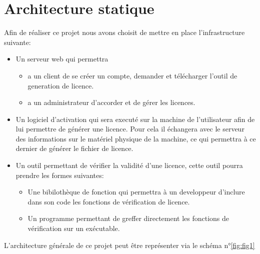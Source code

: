 \chapter{Architecture statique}
Afin de réaliser ce projet nous avons choisit de mettre en place l'infrastructure suivante:
\begin{itemize}
	\item Un serveur web qui permettra
	\begin{itemize}
		\item a un client de se créer un compte, demander et télécharger l'outil de generation
					de licence.
		\item a un administrateur d'accorder et de gérer les licences. 
	\end{itemize}
	\item Un logiciel d'activation qui sera executé sur la machine de l'utilisateur
				afin de lui permettre de générer une licence. Pour cela il échangera avec
				le serveur des informations sur le matériel physique de la machine, ce 
				qui permettra à ce dernier de générer le fichier de licence.
	\item Un outil permettant de vérifier la validité d'une licence, cette outil
				pourra prendre les formes suivantes: 
	\begin{itemize}
	\item Une bibilothèque de fonction qui permettra à un developpeur d'inclure
				dans son code les fonctions de vérification de licence. 
	\item Un programme permettant de greffer directement les fonctions de vérification
				sur un exécutable. 
	\end{itemize}
\end{itemize}
L'architecture générale de ce projet peut être représenter via le schéma n°\ref{fig:fig1}\newline
